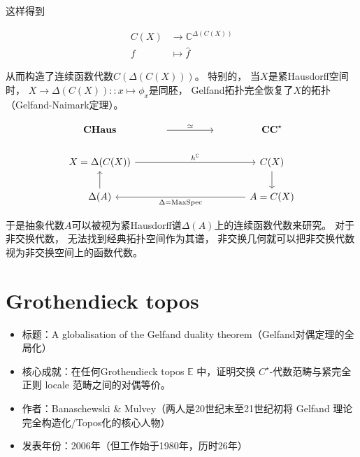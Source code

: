 \documentclass[10pt, openany]{book}
\begin{document}
这样得到

$$
\begin{aligned}
  C(X) &\to \mathbb C^{\Delta(C(X))} \\
  f &\mapsto \hat f
\end{aligned}
$$

从而构造了连续函数代数$C(\Delta(C(X)))$。
特别的，
当$X$是紧Hausdorff空间时，
$X \to \Delta(C(X)) :: x \mapsto \phi_x$是同胚，
Gelfand拓扑完全恢复了$X$的拓扑（Gelfand-Naimark定理）。

$$
\begin{tikzcd}
\textbf{CHaus}                               & {} \arrow[rr, "\simeq"] &  & {} & \textbf{CC}^\star                                \\
X = \Delta(C(X)) \arrow[rrrr, "h^\mathbb C"] &                         &  &    & C(X) \arrow[d]                                   \\
\Delta(A) \arrow[u]                          &                         &  &    & A = C(X) \arrow[llll, "\Delta = \text{MaxSpec}"]
\end{tikzcd}
$$

于是抽象代数$A$可以被视为紧Hausdorff谱$\Delta(A)$上的连续函数代数来研究。
对于非交换代数，
无法找到经典拓扑空间作为其谱，
非交换几何就可以把非交换代数视为非交换空间上的函数代数。


\section{Grothendieck topos}

\begin{itemize}
  \item 
  标题：A globalisation of the Gelfand duality theorem（Gelfand对偶定理的全局化）
  \item 
  核心成就：在任何Grothendieck topos $\mathbb E$ 中，证明交换 $C^\star$-代数范畴与紧完全正则 locale 范畴之间的对偶等价。
  \item 
  作者：Banaschewski \& Mulvey（两人是20世纪末至21世纪初将 Gelfand 理论完全构造化/Topos化的核心人物）
  \item 
发表年份：2006年（但工作始于1980年，历时26年）
\end{itemize}
\end{document}
